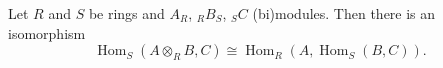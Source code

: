 Let $R$ and $S$ be rings and $A_R$, ${}_R B_S$, ${}_S C$ (bi)modules. Then there is an isomorphism
\[
\operatorname{Hom}_S(A \otimes_R B, C) \cong \operatorname{Hom}_R(A, \operatorname{Hom}_S(B, C)).
\]